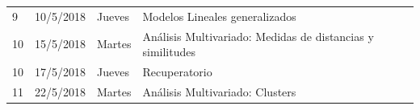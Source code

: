 \documentclass[]{book}
\theoremstyle{definition}
\theoremstyle{definition}
\theoremstyle{definition}
\theoremstyle{remark}
\begin{document}
\begin{longtable}[]{@{}llll@{}}
\begin{minipage}[t]{0.05\columnwidth}
9\strut
\end{minipage} & \begin{minipage}[t]{0.07\columnwidth}\raggedright
10/5/2018\strut
\end{minipage} & \begin{minipage}[t]{0.05\columnwidth}\raggedright
Jueves\strut
\end{minipage} & \begin{minipage}[t]{0.71\columnwidth}\raggedright
Modelos Lineales generalizados\strut
\end{minipage}\tabularnewline
\begin{minipage}[t]{0.05\columnwidth}\raggedright
10\strut
\end{minipage} & \begin{minipage}[t]{0.07\columnwidth}\raggedright
15/5/2018\strut
\end{minipage} & \begin{minipage}[t]{0.05\columnwidth}\raggedright
Martes\strut
\end{minipage} & \begin{minipage}[t]{0.71\columnwidth}\raggedright
Análisis Multivariado: Medidas de distancias y similitudes\strut
\end{minipage}\tabularnewline
\begin{minipage}[t]{0.05\columnwidth}\raggedright
10\strut
\end{minipage} & \begin{minipage}[t]{0.07\columnwidth}\raggedright
17/5/2018\strut
\end{minipage} & \begin{minipage}[t]{0.05\columnwidth}\raggedright
Jueves\strut
\end{minipage} & \begin{minipage}[t]{0.71\columnwidth}\raggedright
Recuperatorio\strut
\end{minipage}\tabularnewline
\begin{minipage}[t]{0.05\columnwidth}\raggedright
11\strut
\end{minipage} & \begin{minipage}[t]{0.07\columnwidth}\raggedright
22/5/2018\strut
\end{minipage} & \begin{minipage}[t]{0.05\columnwidth}\raggedright
Martes\strut
\end{minipage} & \begin{minipage}[t]{0.71\columnwidth}\raggedright
Análisis Multivariado: Clusters\strut
\end{minipage}\tabularnewline

\end{longtable}
\end{document}
